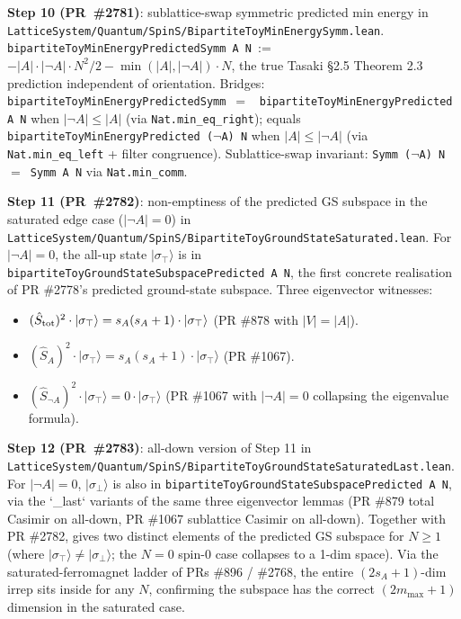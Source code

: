 \documentclass[a4paper,11pt]{article}
\begin{document}
\textbf{Step 10 (PR~\#2781)}: sublattice-swap symmetric predicted
min energy in
\texttt{LatticeSystem/Quantum/SpinS/BipartiteToyMinEnergySymm.lean}.
\texttt{bipartiteToyMinEnergyPredictedSymm A N}~:=~
$-|A|\cdot|\neg A|\cdot N^2/2 - \min(|A|, |\neg A|)\cdot N$, the
true Tasaki §2.5 Theorem 2.3 prediction independent of
orientation. Bridges:
\texttt{bipartiteToyMinEnergyPredictedSymm}~$=$~
\texttt{bipartiteToyMinEnergyPredicted A N} when
$|\neg A| \le |A|$ (via \texttt{Nat.min\_eq\_right}); equals
\texttt{bipartiteToyMinEnergyPredicted ($\neg$A) N} when
$|A| \le |\neg A|$ (via \texttt{Nat.min\_eq\_left} + filter
congruence). Sublattice-swap invariant:
\texttt{Symm ($\neg$A) N $=$ Symm A N} via
\texttt{Nat.min\_comm}.

\textbf{Step 11 (PR~\#2782)}: non-emptiness of the predicted GS
subspace in the saturated edge case ($|\neg A| = 0$) in
\texttt{LatticeSystem/Quantum/SpinS/BipartiteToyGroundStateSaturated.lean}.
For $|\neg A| = 0$, the all-up state $|\sigma_\top\rangle$ is in
\texttt{bipartiteToyGroundStateSubspacePredicted A N}, the first
concrete realisation of PR \#2778's predicted ground-state
subspace. Three eigenvector witnesses:
\begin{itemize}
\item $(\hat S_{\rm tot})^2\cdot|\sigma_\top\rangle =
s_A(s_A+1)\cdot|\sigma_\top\rangle$ (PR \#878 with $|V| = |A|$).
\item $(\hat S_A)^2\cdot|\sigma_\top\rangle =
s_A(s_A+1)\cdot|\sigma_\top\rangle$ (PR \#1067).
\item $(\hat S_{\neg A})^2\cdot|\sigma_\top\rangle =
0\cdot|\sigma_\top\rangle$ (PR \#1067 with $|\neg A| = 0$
collapsing the eigenvalue formula).
\end{itemize}

\textbf{Step 12 (PR~\#2783)}: all-down version of Step 11 in
\texttt{LatticeSystem/Quantum/SpinS/BipartiteToyGroundStateSaturatedLast.lean}.
For $|\neg A| = 0$, $|\sigma_\bot\rangle$ is also in
\texttt{bipartiteToyGroundStateSubspacePredicted A N}, via the
`\_last` variants of the same three eigenvector lemmas (PR \#879
total Casimir on all-down, PR \#1067 sublattice Casimir on
all-down). Together with PR \#2782, gives two distinct elements
of the predicted GS subspace for $N \ge 1$ (where
$|\sigma_\top\rangle \ne |\sigma_\bot\rangle$; the $N = 0$ spin-$0$
case collapses to a 1-dim space). Via the
saturated-ferromagnet ladder of PRs \#896 / \#2768, the entire
$(2 s_A + 1)$-dim irrep sits inside for any $N$, confirming the
subspace has the correct $(2 m_{\max} + 1)$ dimension in the
saturated case.
\end{document}
